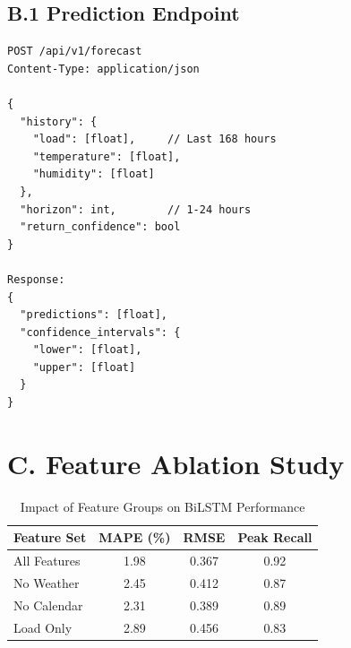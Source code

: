 \documentclass[12pt,a4paper]{report}
\begin{document}
\subsection*{B.1 Prediction Endpoint}
\begin{verbatim}
POST /api/v1/forecast
Content-Type: application/json

{
  "history": {
    "load": [float],     // Last 168 hours
    "temperature": [float],
    "humidity": [float]
  },
  "horizon": int,        // 1-24 hours
  "return_confidence": bool
}

Response:
{
  "predictions": [float],
  "confidence_intervals": {
    "lower": [float],
    "upper": [float]
  }
}
\end{verbatim}

\section*{C. Feature Ablation Study}

\begin{table}[h]
\caption{Impact of Feature Groups on BiLSTM Performance}
\begin{tabular}{|l|c|c|c|}
\hline
\textbf{Feature Set} & \textbf{MAPE (\%)} & \textbf{RMSE} & \textbf{Peak Recall} \\
\hline
All Features & 1.98 & 0.367 & 0.92 \\
No Weather & 2.45 & 0.412 & 0.87 \\
No Calendar & 2.31 & 0.389 & 0.89 \\
Load Only & 2.89 & 0.456 & 0.83 \\
\hline
\end{tabular}
\end{table}

\end{document}
